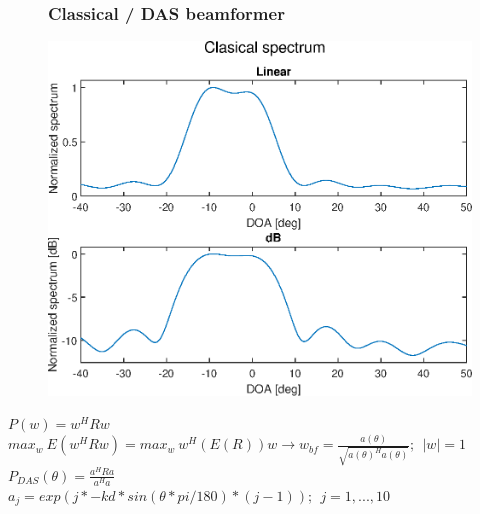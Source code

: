 \documentclass{beamer}
\begin{document}
\begin{frame}
	\begin{figure}
    	\frametitle{Classical / DAS beamformer}
		\centering
    	\includegraphics[scale=0.4]{Classical.eps}\\	
	\end{figure}
    $P(w) = w^H R w$\\
    $max_w\ E(w^H R w) = max_w\ w^H (E(R))w \rightarrow w_{bf} = \frac{a(\theta)}					 		{\sqrt{a(\theta)^H a(\theta)}};\ \ |w|=1$\\
    $P_{DAS}(\theta) = \frac{a^H R a}{a^H a}$\\
    $a_j = exp(j*-kd*sin(\theta*pi/180) * (j-1));\ \  j=1, ... ,10$
 \end{frame}
\end{document}
